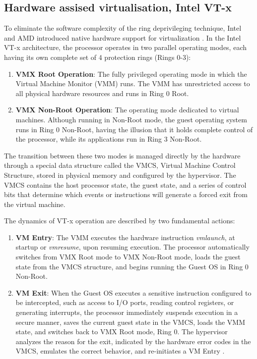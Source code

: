 \subsection{Hardware assised virtualisation, Intel VT-x}
To eliminate the software complexity of the ring deprivileging technique, Intel and AMD introduced native hardware support for virtualization \cite{vm-security.pdf, vm-attack-vectors}. In the Intel VT-x architecture, the processor operates in two parallel operating modes, each having its own complete set of 4 protection rings (Rings 0-3):
    \begin{enumerate}
        \item \textbf{VMX Root Operation}: The fully privileged operating mode in which the Virtual Machine Monitor (VMM) runs. The VMM has unrestricted access to all physical hardware resources and runs in Ring 0 Root.
        \item \textbf{VMX Non-Root Operation}: The operating mode dedicated to virtual machines. Although running in Non-Root mode, the guest operating system runs in Ring 0 Non-Root, having the illusion that it holds complete control of the processor, while its applications run in Ring 3 Non-Root.
    \end{enumerate}
The transition between these two modes is managed directly by the hardware through a special data structure called the VMCS, Virtual Machine Control Structure, stored in physical memory and configured by the hypervisor. The VMCS contains the host processor state, the guest state, and a series of control bits that determine which events or instructions will generate a forced exit from the virtual machine.

The dynamics of VT-x operation are described by two fundamental actions:

    \begin{enumerate}
        \item \textbf{VM Entry}: The VMM executes the hardware instruction \emph{vmlaunch}, at startup or \emph{vmresume}, upon resuming execution. The processor automatically switches from VMX Root mode to VMX Non-Root mode, loads the guest state from the VMCS structure, and begins running the Guest OS in Ring 0 Non-Root.
        \item \textbf{VM Exit}: When the Guest OS executes a sensitive instruction configured to be intercepted, such as access to I/O ports, reading control registers, or generating interrupts, the processor immediately suspends execution in a secure manner, saves the current guest state in the VMCS, loads the VMM state, and switches back to VMX Root mode, Ring 0. The hypervisor analyzes the reason for the exit, indicated by the hardware error codes in the VMCS, emulates the correct behavior, and re-initiates a VM Entry \cite{reuben2007virtual}.
    \end{enumerate}